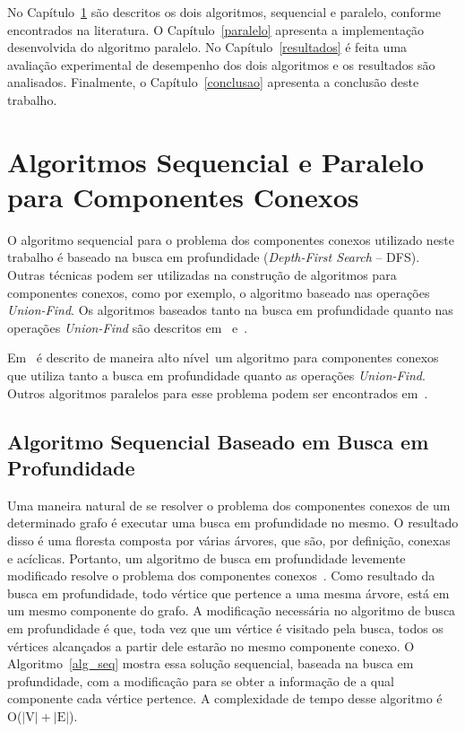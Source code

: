 \documentclass[12pt]{article}
\begin{document}
No Capítulo~\ref{algoritmos} são descritos os dois algoritmos, sequencial e paralelo, conforme encontrados na literatura. O Capítulo~\ref{paralelo} apresenta a implementação desenvolvida do algoritmo paralelo. No Capítulo~\ref{resultados} é feita uma avaliação experimental de desempenho dos dois algoritmos e os resultados são analisados. Finalmente, o Capítulo~\ref{conclusao} apresenta a conclusão deste trabalho.

\section{Algoritmos Sequencial e Paralelo para Componentes Conexos}
\label{algoritmos}

O algoritmo sequencial para o problema dos componentes conexos utilizado neste trabalho é baseado na busca em profundidade (\emph{Depth-First Search} -- DFS). Outras técnicas podem ser utilizadas na construção de algoritmos para componentes conexos, como por exemplo, o algoritmo baseado nas operações \emph{Union-Find}. Os algoritmos baseados tanto na busca em profundidade quanto nas operações \emph{Union-Find} são descritos em~\cite{Sedgewick:2011} e~\cite{Cormen:2009}.

Em~\cite{Grama:2003} é descrito de maneira alto nível um algoritmo para componentes conexos que utiliza tanto a busca em profundidade quanto as operações \emph{Union-Find}. Outros algoritmos paralelos para esse problema podem ser encontrados em~\cite{Roosta:1999}.

\subsection{Algoritmo Sequencial Baseado em Busca em Profundidade}

Uma maneira natural de se resolver o problema dos componentes conexos de um determinado grafo é executar uma busca em profundidade no mesmo. O resultado disso é uma floresta composta por várias árvores, que são, por definição, conexas e acíclicas. Portanto, um algoritmo de busca em profundidade levemente modificado resolve o problema dos componentes conexos~\cite{Grama:2003, Sedgewick:2011}. Como resultado da busca em profundidade, todo vértice que pertence a uma mesma árvore, está em um mesmo componente do grafo. 
A modificação necessária no algoritmo de busca em profundidade é que, toda vez que um vértice é visitado pela busca, todos os vértices alcançados a partir dele estarão no mesmo componente conexo. O Algoritmo~\ref{alg_seq} mostra essa solução sequencial, baseada na busca em profundidade, com a modificação para se obter a informação de a qual componente cada vértice pertence. A complexidade de tempo desse algoritmo é O($|\text{V}|+|\text{E}|$).
\end{document}
